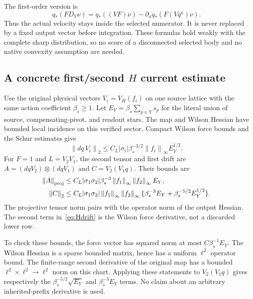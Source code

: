 \documentclass[11pt,letterpaper]{article}
\theoremstyle{plain}
\theoremstyle{remark}\newtheorem{remark}[theorem]{Scope}
\newcommand{\norm}[1]{\left\lVert#1\right\rVert}
\begin{document}
The first-order version is
\begin{equation}
q_*(F D_V\nu)=q_*((VF)\nu)-\partial_aq_*(F(Vq^a)\nu).
\label{eq:firstweakpush}
\end{equation}
Thus the actual velocity stays inside the selected numerator. It is never
replaced by a fixed output vector before integration. These formulas hold
weakly with the complete sharp distribution, so no score of a disconnected
selected body and no native convexity assumption are needed.

\subsection{A concrete first/second $H$ current estimate}

Use the original physical vectors $V_i=V_H(f_i)$ on one source lattice with
the same action coefficient $\beta_s\ge1$. Let $E_Y=\beta_s\sum_{p\in Y}s_p$
for the literal union of source, compensating-pivot, and readout stars. The
map and Wilson Hessian have bounded local incidence on this verified sector.
Compact Wilson force bounds and the Schur estimates give
\begin{equation}
\norm{dq\,V_i}_2
\le C_L|\sigma_i|\beta_s^{-3/2}\norm{f_i}_\infty E_Y^{1/2}.
\label{eq:Hvelocity}
\end{equation}
For $F=1$ and $L=V_2V_1$, the second tensor and first drift are
$A=(dqV_2)\otimes(dqV_1)$ and $C=V_2(V_1q)$. Their bounds are
\begin{align}
\norm A_{\rm proj}
&\le C_L|\sigma_1\sigma_2|\beta_s^{-3}
\norm{f_1}_\infty\norm{f_2}_\infty E_Y,\label{eq:Htensor}\\
\norm C_2
&\le C_L|\sigma_1\sigma_2|\norm{f_1}_\infty\norm{f_2}_\infty
\{\beta_s^{-3}E_Y+\beta_s^{-5/2}E_Y^{1/2}\}.
\label{eq:Hdrift}
\end{align}
The projective tensor norm pairs with the operator norm of the output
Hessian. The second term in~\eqref{eq:Hdrift} is the Wilson force derivative,
not a discarded lower row.

To check these bounds, the force vector has squared norm at most
$C\beta_s^{-1}E_Y$. The Wilson Hessian is a sparse bounded matrix, hence
has a uniform $\ell^2$ operator bound. The finite-range second derivative of
the original map has a bounded $\ell^2\times\ell^2\to\ell^2$ norm on
this chart. Applying these statements to $V_2(V_1q)$ gives respectively the
$\beta_s^{-5/2}\sqrt{E_Y}$ and $\beta_s^{-3}E_Y$ terms. No claim about an
arbitrary inherited-prefix derivative is used.
\end{document}
